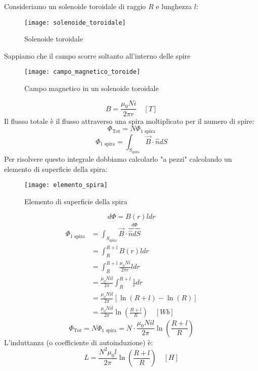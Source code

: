 \documentclass[a4paper]{article}
\begin{document}
\begin{example}
  Consideriamo un solenoide toroidale di raggio \( R \) e lunghezza \( l \):
  \begin{figure}[H]
    \centering
    \texttt{[image: solenoide\_toroidale]}
    \caption{Solenoide toroidale}
  \end{figure}
  \noindent
  Sappiamo che il campo scorre soltanto all'interno delle spire 
  \begin{figure}[H]
    \centering
    \texttt{[image: campo\_magnetico\_toroide]}
    \caption{Campo magnetico in un solenoide toroidale}
  \end{figure}
  \[
    B = \frac{\mu_0 N i}{2 \pi r} \quad \left[ T \right]
  \] 
  Il flusso totale è il flusso attraverso una spira moltiplicato per il numero di spire:
  \[
    \Phi_{\text{Tot}} = N \Phi_{1 \text{ spira}}
  \] 
  \[
    \Phi_{1 \text{ spira}} = \int_{S_{\text{spira}}} \vec{B} \cdot \hat{n} dS
  \] 
  Per risolvere questo integrale dobbiamo calcolarlo "a pezzi" calcolando un elemento
  di superficie della spira:
  \begin{figure}[H]
    \centering
    \texttt{[image: elemento\_spira]}
    \caption{Elemento di superficie della spira}
  \end{figure}
  \[
  d \Phi = B(r) l dr
  \] 
  \[
    \begin{aligned}
      \Phi_{1 \text{ spira}} &= \int_{S_{\text{spira}}} \vec{B} \cdot \overbrace{\hat{n} dS}^{d \Phi}\\
                             &= \int_R^{R + l} B(r) l dr \\
                             &= \int_R^{R + l} \frac{\mu_0 N i}{2 \pi r} l dr \\
                             &= \frac{\mu_0 N i l}{2 \pi} \int_R^{R + l} \frac{1}{r} dr \\
                             &= \frac{\mu_0 N i l}{2 \pi} \left[ \ln(R + l) - \ln(R) \right] \\
                             &= \frac{\mu_0 N i l}{2 \pi} \ln \left( \frac{R + l}{R} \right) \quad \left[ Wb \right]
    \end{aligned}
  \] 
  \[
    \Phi_{\text{Tot}} = N \Phi_{1 \text{ spira}} = N \cdot \frac{\mu_0 N i l}{2 \pi} \ln \left( \frac{R + l}{R} \right)
  \] 
  L'induttanza (o coefficiente di autoinduzione) è:
  \[
    L = \frac{N^2 \mu_0 l}{2 \pi} \ln \left( \frac{R + l}{R} \right) \quad \left[ H \right]
  \] 
\end{example}
\end{document}
